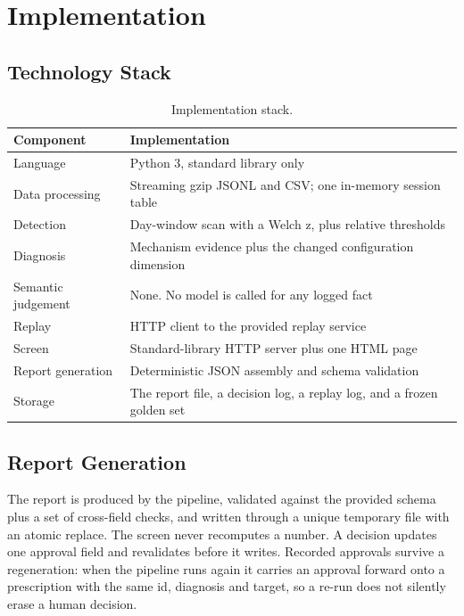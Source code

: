 \documentclass[8pt,twocolumn,a4paper]{extarticle}
\begin{document}

\section{Implementation}

\subsection{Technology Stack}

\begin{table}[H]
\centering
\caption{Implementation stack.}
\label{tab:stack}
\small
\begin{tabularx}{\columnwidth}{@{}l X@{}}
\toprule
\textbf{Component} & \textbf{Implementation} \\
\midrule
Language & Python 3, standard library only \\
Data processing & Streaming gzip JSONL and CSV; one in-memory session table \\
Detection & Day-window scan with a Welch z, plus relative thresholds \\
Diagnosis & Mechanism evidence plus the changed configuration dimension \\
Semantic judgement & None. No model is called for any logged fact \\
Replay & HTTP client to the provided replay service \\
Screen & Standard-library HTTP server plus one HTML page \\
Report generation & Deterministic JSON assembly and schema validation \\
Storage & The report file, a decision log, a replay log, and a frozen golden set \\
\bottomrule
\end{tabularx}
\end{table}

\subsection{Report Generation}

The report is produced by the pipeline, validated against the provided
schema plus a set of cross-field checks, and written through a unique
temporary file with an atomic replace. The screen never recomputes a
number. A decision updates one approval field and revalidates before it
writes. Recorded approvals survive a regeneration: when the pipeline
runs again it carries an approval forward onto a prescription with the
same id, diagnosis and target, so a re-run does not silently erase a
human decision.
\end{document}
